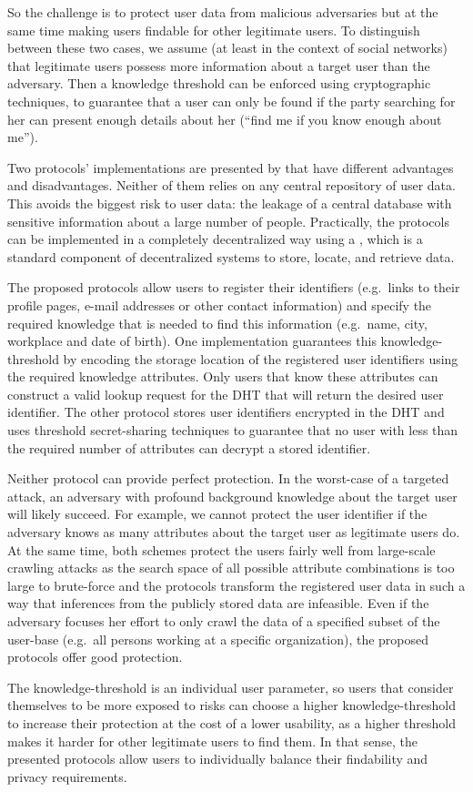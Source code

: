 So the challenge is to protect user data from malicious adversaries but
at the same time making users findable for other legitimate users.
To distinguish between these two cases, we assume (at least in the
context of social networks) that legitimate users
possess more information about a target user than the adversary. 
Then a knowledge threshold can be enforced using cryptographic techniques, to
guarantee that a user can only be found if the party searching for her
can present enough details about her (\enquote{find me if you know enough about
me}).

Two protocols' implementations are presented by \citet{ThresholdUserSearch} 
that have different advantages and disadvantages.
Neither of them relies on any central repository of user data.
This avoids the biggest risk to user data: the leakage of a central database 
with sensitive information about a large number of
people. Practically, the protocols can be implemented in a completely
decentralized way using a , which is a standard component of
decentralized systems to store, locate, and retrieve data.

The proposed protocols allow users to register their identifiers (e.g.\ 
links to their profile pages, e-mail addresses or other contact
information) and specify the required knowledge that is needed to find
this information (e.g.\  name, city, workplace and date of birth).
One implementation guarantees this knowledge-threshold by encoding the
storage location of the registered user identifiers using the required
knowledge attributes.
Only users that know these attributes can construct a valid lookup request for 
the \ac{DHT} that will return the desired user identifier.
The other protocol stores user identifiers encrypted in the \ac{DHT} and uses 
threshold secret-sharing techniques to guarantee that no user with less than 
the required number of attributes can decrypt a stored identifier.

Neither protocol can provide perfect protection.
In the worst-case of a targeted attack, an adversary with profound background 
knowledge about the target user will likely succeed.
For example, we cannot protect the user identifier if the adversary knows as 
many attributes about the target user as legitimate users do.
At the same time, both schemes protect the users fairly well from large-scale 
crawling attacks as the search space of all possible attribute combinations is 
too large to brute-force and the protocols transform the registered user data 
in such a way that inferences from the publicly stored data are infeasible.
Even if the adversary focuses her effort to only crawl the data of a specified 
subset of the user-base (e.g.\ all persons working at a specific organization), 
the proposed protocols offer good protection. 

The knowledge-threshold is an individual user parameter, so users that
consider themselves to be more exposed to risks can choose a higher
knowledge-threshold to increase their protection at the cost of a lower
usability, as a higher threshold makes it harder for other legitimate
users to find them.
In that sense, the presented protocols allow users to individually balance 
their findability and privacy requirements.

